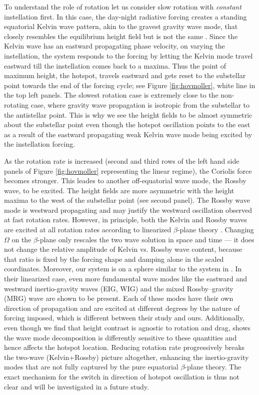 \documentclass[trackchanges,twocolumn]{aastex7}
\begin{document}
To understand the role of rotation let us consider slow rotation with \textit{constant} instellation first. In this case, the day-night radiative forcing creates a standing equatorial Kelvin wave pattern, akin to the gravest gravity wave mode, that closely resembles the equilibrium height field but is not the same \citep{Gill1980,ShowmanPolvani2011}. Since the Kelvin wave has an eastward propagating phase velocity, on varying the instellation, the system responds to the forcing by letting the Kelvin mode travel eastward till the instellation comes back to a maxima. Thus the point of maximum height, the hotspot, travels eastward and gets reset to the substellar point towards the end of the forcing cycle; see Figure \ref{fig:hovmoller}, white line in the top left panels. The slowest rotation case is extremely close to the non-rotating case, where gravity wave propagation is isotropic from the substellar to the antistellar point. This is why we see the height fields to be almost symmetric about the substellar point even though the hotspot oscillation points to the east as a result of the eastward propagating weak Kelvin wave mode being excited by the instellation forcing.

As the rotation rate is increased (second and third rows of the left hand side panels of Figure \ref{fig:hovmoller} representing the linear regime), the Coriolis force becomes stronger. This leades to another off-equatorial wave mode, the Rossby wave, to be excited. The height fields are more asymmetric with the height maxima to the west of the substellar point (see second panel). The Rossby wave mode is westward propagating \citep{Matsuno1966,Gill1980} and may justify the westward oscillation observed at fast rotation rates. However, in principle, both the Kelvin and Rossby waves are excited at all rotation rates according to linearized $\beta$-plane theory \citep{Matsuno1966,Gill1980}. Changing $\Omega$ on the $\beta$-plane only rescales the two wave solution in space and time — it does not change the relative amplitude of Kelvin vs. Rossby wave content, because that ratio is fixed by the forcing shape and damping alone in the scaled coordinates. Moreover, our system is on a sphere similar to the system in \cite{Shamir2023}. In their linearized case, even more fundamental wave modes like the eastward and westward inertio-gravity waves (EIG, WIG) and the mixed Rossby--gravity (MRG) wave are shown to be present. Each of these modes have their own direction of propagation and are excited at different degrees by the nature of forcing imposed, which is different between their study and ours. Additionally, even though we find that height contrast is agnostic to rotation and drag, \citet{Shamir2023} shows the wave mode decomposition is differently sensitive to these quantities and hence affects the hotspot location. Reducing rotation rate progressively breaks the two-wave (Kelvin+Rossby) picture altogether, enhancing the inertio-gravity modes that are not fully captured by the pure equatorial $\beta$-plane theory. The exact mechanism for the switch in direction of hotspot oscillation is thus not clear and will be investigated in a future study.
\end{document}
